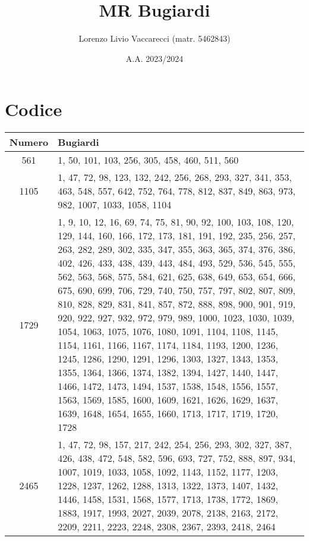 \documentclass[12pt]{article}
\title{MR Bugiardi}
\author{Lorenzo Livio Vaccarecci (matr. 5462843)}
\date{A.A. 2023/2024}
\begin{document}
\maketitle
\section{Codice}

\begin{tabular}{|c|p{16cm}|}
    \hline
    \textbf{Numero} & \textbf{Bugiardi} \\
    \hline
    561 & \scriptsize{1, 50, 101, 103, 256, 305, 458, 460, 511, 560} \\
    \hline
    1105 & \scriptsize{1, 47, 72, 98, 123, 132, 242, 256, 268, 293, 327, 341, 353, 463, 548, 557, 642, 752, 764, 778, 812, 837, 849, 863, 973, 982, 1007, 1033, 1058, 1104} \\
    \hline
    1729 & \scriptsize{1, 9, 10, 12, 16, 69, 74, 75, 81, 90, 92, 100, 103, 108, 120, 129, 144, 160, 166, 172, 173, 181, 191, 192, 235, 256, 257, 263, 282, 289, 302, 335, 347, 355, 363, 365, 374, 376, 386, 402, 426, 433, 438, 439, 443, 484, 493, 529, 536, 545, 555, 562, 563, 568, 575, 584, 621, 625, 638, 649, 653, 654, 666, 675, 690, 699, 706, 729, 740, 750, 757, 797, 802, 807, 809, 810, 828, 829, 831, 841, 857, 872, 888, 898, 900, 901, 919, 920, 922, 927, 932, 972, 979, 989, 1000, 1023, 1030, 1039, 1054, 1063, 1075, 1076, 1080, 1091, 1104, 1108, 1145, 1154, 1161, 1166, 1167, 1174, 1184, 1193, 1200, 1236, 1245, 1286, 1290, 1291, 1296, 1303, 1327, 1343, 1353, 1355, 1364, 1366, 1374, 1382, 1394, 1427, 1440, 1447, 1466, 1472, 1473, 1494, 1537, 1538, 1548, 1556, 1557, 1563, 1569, 1585, 1600, 1609, 1621, 1626, 1629, 1637, 1639, 1648, 1654, 1655, 1660, 1713, 1717, 1719, 1720, 1728} \\
    \hline
    2465 & \scriptsize{1, 47, 72, 98, 157, 217, 242, 254, 256, 293, 302, 327, 387, 426, 438, 472, 548, 582, 596, 693, 727, 752, 888, 897, 934, 1007, 1019, 1033, 1058, 1092, 1143, 1152, 1177, 1203, 1228, 1237, 1262, 1288, 1313, 1322, 1373, 1407, 1432, 1446, 1458, 1531, 1568, 1577, 1713, 1738, 1772, 1869, 1883, 1917, 1993, 2027, 2039, 2078, 2138, 2163, 2172, 2209, 2211, 2223, 2248, 2308, 2367, 2393, 2418, 2464} \\
    \hline

\end{tabular}
\end{document}
